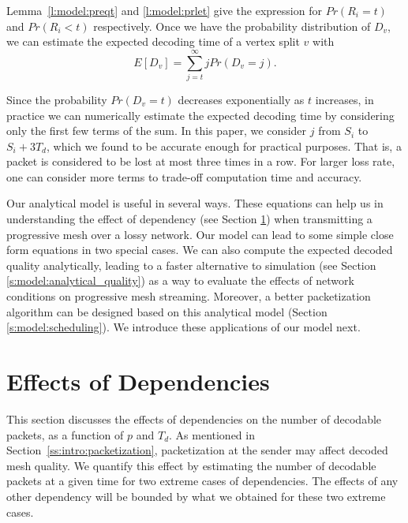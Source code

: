     Lemma~\ref{l:model:preqt} and \ref{l:model:prlet} give the expression
    for $Pr(R_i=t)$ and $Pr(R_i<t)$ respectively.
    Once we have the probability distribution of $D_v$, we can
    estimate the expected decoding time of a vertex split $v$
    with
    \begin{equation}
    \label{e:model:e_et}
        E[D_v] = \sum_{j=t}^{\infty}jPr(D_v = j).
    \end{equation}

    Since the probability $Pr(D_v = t)$ decreases exponentially
    as $t$ increases, in practice we can numerically estimate the
    expected decoding time by considering only the first few
    terms of the sum.  In this paper, we consider $j$ from $S_i$ to $S_i + 3T_d$,
    which we found to be accurate enough for practical purposes.
    That is,
    a packet is considered to be lost at most three times in a row.
    For larger loss rate, one can consider more terms to trade-off
    computation time and accuracy.


    Our analytical model is useful in several ways.  
    These equations can help us in understanding the effect of dependency (see Section \ref{s:model:effect}) when transmitting 
    a progressive mesh over a lossy network.  Our model can lead to some simple close form equations in two special cases.  
    We can also compute the expected decoded quality analytically, leading to a faster alternative to 
    simulation (see Section \ref{s:model:analytical_quality}) as a way to evaluate the effects of network conditions on
    progressive mesh streaming.
    Moreover, a better packetization algorithm can be designed based on this analytical model (Section \ref{s:model:scheduling}). 
    We introduce these applications of our model next.


\section{Effects of Dependencies}
\label{s:model:effect}

    This section discusses the effects of dependencies
    on the number of decodable packets, as a function of
    $p$ and $T_d$.  As mentioned in Section~\ref{ss:intro:packetization},
    packetization at the sender may affect
    decoded mesh quality.  We quantify 
    this effect by estimating the number of
    decodable packets at a given time for two extreme cases
    of dependencies.  The effects of any other dependency
    will be bounded by what we obtained for these two extreme cases.

